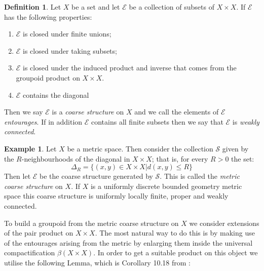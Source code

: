 \documentclass[11pt]{amsart}
\theoremstyle{plain}
\theoremstyle{definition}%
\newtheorem{definition}[theorem]{Definition}%
\newtheorem{example}[theorem]{Example}%
\theoremstyle{remark}%
\begin{document}
\begin{definition}
Let $X$ be a set and let $\mathcal{E}$ be a collection of subsets of $X \times X$. If $\mathcal{E}$ has the following properties:
\begin{enumerate}
\item $\mathcal{E}$ is closed under finite unions;
\item $\mathcal{E}$ is closed under taking subsets;
\item $\mathcal{E}$ is closed under the induced product and inverse that comes from the groupoid product on $X \times X$.
\item $\mathcal{E}$ contains the diagonal
\end{enumerate}
Then we say $\mathcal{E}$ is a \textit{coarse structure} on $X$ and we call the elements of $\mathcal{E}$ \textit{entourages}. If in addition $\mathcal{E}$ contains all finite subsets then we say that $\mathcal{E}$ is \textit{weakly connected}.
\end{definition}

\begin{example}\label{ex:MCS}
Let $X$ be a metric space. Then consider the collection $\mathcal{S}$ given by the $R$-neighbourhoods of the diagonal in $X\times X$; that is, for every $R>0$ the set:
\begin{equation*}
\Delta_{R}=\lbrace (x,y) \in X \times X | d(x,y)\leq R \rbrace
\end{equation*}
Then let $\mathcal{E}$ be the coarse structure generated by $\mathcal{S}$. This is called the \textit{metric coarse structure} on $X$. If  $X$ is a uniformly discrete bounded geometry  metric space this coarse structure is uniformly locally finite, proper and weakly connected.
\end{example}

To build a groupoid from the metric coarse structure on $X$ we consider extensions of the pair product on $X \times X$. The most natural way to do this is by making use of the entourages arising from the metric by enlarging them inside the universal compactification $\beta(X \times X)$. In order to get a suitable product on this object we utilise the following Lemma, which is Corollary 10.18 from \cite{MR2007488}:
\end{document}
